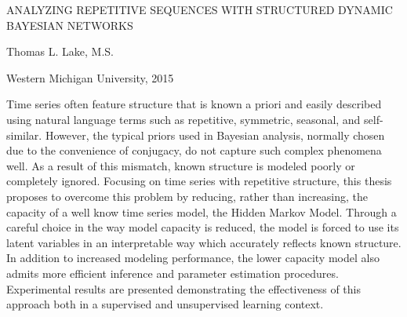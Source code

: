 \thispagestyle{empty}
\begin{center}
    ANALYZING REPETITIVE SEQUENCES WITH STRUCTURED DYNAMIC BAYESIAN NETWORKS

    \vspace{3\baselineskip}
    Thomas L. Lake, M.S.

    \vspace{\baselineskip}
    Western Michigan University, 2015
\end{center}
\vspace{3\baselineskip}
Time series often feature structure that is known a priori and easily described using
natural language terms such as repetitive, symmetric, seasonal, and self-similar.
However, the typical priors used in Bayesian analysis, normally chosen due to the
convenience of conjugacy, do not capture such complex phenomena well.
As a result of this mismatch, known structure is modeled poorly or completely ignored.
Focusing on time series with repetitive structure, this thesis proposes to overcome this
problem by reducing, rather than increasing, the capacity of a well know time series model,
the Hidden Markov Model.
Through a careful choice in the way model capacity is reduced, the model is forced to use
its latent variables in an interpretable way which accurately reflects known structure.
In addition to increased modeling performance, the lower capacity model also admits more
efficient inference and parameter estimation procedures.
Experimental results are presented demonstrating the effectiveness of this approach both
in a supervised and unsupervised learning context.
\newpage
\restoregeometry
